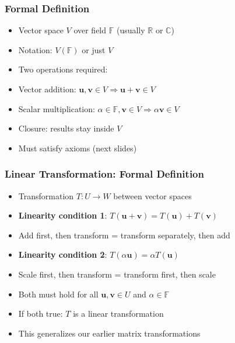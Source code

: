 \begin{frame}[fragile]\frametitle{Formal Definition}
  \begin{itemize}
    \item Vector space $V$ over field $\mathbb{F}$ (usually $\mathbb{R}$ or $\mathbb{C}$)
    \item Notation: $V(\mathbb{F})$ or just $V$
    \item Two operations required:
    \item Vector addition: $\mathbf{u}, \mathbf{v} \in V \Rightarrow \mathbf{u} + \mathbf{v} \in V$
    \item Scalar multiplication: $\alpha \in \mathbb{F}, \mathbf{v} \in V \Rightarrow \alpha \mathbf{v} \in V$
    \item Closure: results stay inside $V$
    \item Must satisfy axioms (next slides)
  \end{itemize}
\end{frame}

\begin{frame}[fragile]\frametitle{Linear Transformation: Formal Definition}
  \begin{itemize}
    \item Transformation $T: U \to W$ between vector spaces
    \item \textbf{Linearity condition 1}: $T(\mathbf{u} + \mathbf{v}) = T(\mathbf{u}) + T(\mathbf{v})$
    \item Add first, then transform = transform separately, then add
    \item \textbf{Linearity condition 2}: $T(\alpha \mathbf{u}) = \alpha T(\mathbf{u})$
    \item Scale first, then transform = transform first, then scale
    \item Both must hold for all $\mathbf{u}, \mathbf{v} \in U$ and $\alpha \in \mathbb{F}$
    \item If both true: $T$ is a linear transformation
    \item This generalizes our earlier matrix transformations
  \end{itemize}
\end{frame}

